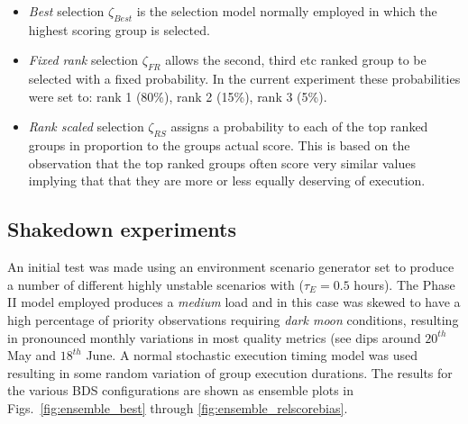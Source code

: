 \begin{itemize}
\item \emph{Best} selection $\zeta_{Best}$ is the selection model normally employed in which the highest scoring group is selected.

\item \emph{Fixed rank} selection $\zeta_{FR}$ allows the second, third etc ranked group to be selected with a fixed probability. In the current experiment these probabilities were set to: rank 1 (80\%), rank 2 (15\%), rank 3 (5\%). 

\item \emph{Rank scaled} selection $\zeta_{RS}$ assigns a probability to each of the top ranked groups in proportion to the groups actual score. This is based on the observation that the top ranked groups often score very similar values implying that that they are more or less equally deserving of execution. 

\end{itemize}


\subsection{Shakedown experiments}
 An initial test was made using an environment scenario generator set to produce a number of different highly unstable scenarios with ($\tau_E = 0.5$ hours). The Phase II model employed produces a \emph{medium} load and in this case was skewed to have a high percentage of priority observations requiring \emph{dark moon} conditions, resulting in pronounced monthly variations in most quality metrics (see dips around $20^{th}$ May and $18^{th}$ June. A normal stochastic execution timing model was used resulting in some random variation of group execution durations. The results for the various BDS configurations are shown as ensemble plots in Figs.~\ref{fig:ensemble_best} through \ref{fig:ensemble_relscorebias}.

